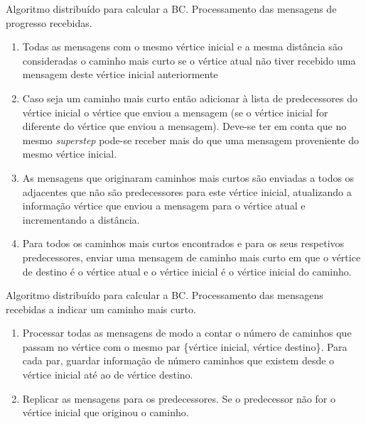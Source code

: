 \begin{algorithm}
  \caption{Algoritmo distribuído para calcular a BC. Processamento das 
mensagens de progresso recebidas.}
  \label{alg:msgprogbc}
  \begin{enumerate}
		\item Todas as mensagens com o mesmo vértice inicial e a mesma distância são consideradas o caminho mais curto se o vértice atual não tiver recebido uma mensagem deste vértice inicial anteriormente
    \item Caso seja um caminho mais curto então adicionar à lista de 
predecessores do vértice inicial o vértice que enviou a mensagem (se o 
vértice inicial for diferente do vértice que enviou a mensagem). Deve-se 
ter em conta que no mesmo \textit{superstep} pode-se receber mais do que uma 
mensagem proveniente do mesmo vértice inicial.
    \item As mensagens que originaram caminhos mais curtos são enviadas a todos os adjacentes que não são predecessores para este vértice inicial,  atualizando a informação vértice que enviou a mensagem para o vértice atual e incrementando a distância.
    \item Para todos os caminhos mais curtos encontrados e para os 
seus respetivos predecessores, enviar uma mensagem de caminho mais curto em que o vértice de destino é o vértice atual e o vértice inicial é o vértice inicial do caminho.
  \end{enumerate}
\end{algorithm}

\begin{algorithm}
  \caption{Algoritmo distribuído para calcular a BC. Processamento das 
mensagens recebidas a indicar um caminho mais curto.}
  \label{alg:msgpathbc}
  \begin{enumerate}  
     \item Processar todas as mensagens de modo a contar o número de 
caminhos que passam no vértice com o mesmo par \{vértice inicial, vértice destino\}. 
Para cada par, guardar informação de número caminhos que existem desde o 
vértice inicial até ao de vértice destino.
     \item Replicar as mensagens para os predecessores. Se o predecessor não for o vértice inicial que originou o caminho.
  \end{enumerate}
\end{algorithm}

